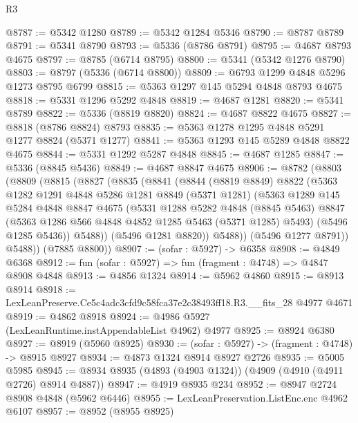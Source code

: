 \begin{lexlean}{R3}
\begin{coremodule}
@8787 := @5342 @1280
@8789 := @5342 @1284 @5346
@8790 := @8787 @8789
@8791 := @5341 @8790
@8793 := @5336 (@8786 @8791)
@8795 := @4687 @8793 @4675
@8797 := @8785 (@6714 @8795)
@8800 := @5341 (@5342 @1276 @8790)
@8803 := @8797 (@5336 (@6714 @8800))
@8809 := @6793 @1299 @4848 @5296 @1273 @8795 @6799
@8815 := @5363 @1297 @145 @5294 @4848 @8793 @4675
@8818 := @5331 @1296 @5292 @4848
@8819 := @4687 @1281
@8820 := @5341 @8789
@8822 := @5336 (@8819 @8820)
@8824 := @4687 @8822 @4675
@8827 := @8818 (@8786 @8824) @8793
@8835 := @5363 @1278 @1295 @4848 @5291 @1277 @8824 (@5371 @1277)
@8841 := @5363 @1293 @145 @5289 @4848 @8822 @4675
@8844 := @5331 @1292 @5287 @4848
@8845 := @4687 @1285
@8847 := @5336 (@8845 @5436)
@8849 := @4687 @8847 @4675
@8906 := @8782
    (@8803
      (@8809
        (@8815
          (@8827
            (@8835
              (@8841
                (@8844
                  (@8819 @8849)
                  @8822
                  (@5363
                    @1282
                    @1291
                    @4848
                    @5286
                    @1281
                    @8849
                    (@5371 @1281)
                    (@5363
                      @1289
                      @145
                      @5284
                      @4848
                      @8847
                      @4675
                      (@5331
                        @1288
                        @5282
                        @4848
                        (@8845 @5463)
                        @8847
                        (@5363 @1286 @566 @4848 @4852 @1285 @5463 (@5371 @1285) @5493)
                        (@5496 @1285 @5436))
                      @5488))
                  (@5496 @1281 @8820))
                @5488))
            (@5496 @1277 @8791))
          @5488))
      (@7885 @8800))
@8907 := (sofar : @5927) -> @6358
@8908 := @4849 @6368
@8912 := fun (sofar : @5927) => fun (fragment : @4748) => @4847 @8908 @4848
@8913 := @4856 @1324
@8914 := @5962 @4860
@8915 := @8913 @8914
@8918 := LexLeanPreserve.Ce5c4adc3cfd9c58fca37e2c38493ff18.R3.__fits_28 @4977 @4671
@8919 := @4862 @8918
@8924 := @4986 @5927 (LexLeanRuntime.instAppendableList @4962) @4977
@8925 := @8924 @6380
@8927 := @8919 (@5960 @8925)
@8930 := (sofar : @5927) -> (fragment : @4748) -> @8915 @8927
@8934 := @4873 @1324 @8914 @8927 @2726
@8935 := @5005 @5985
@8945 := @8934 @8935 (@4893 (@4903 @1324)) (@4909 (@4910 (@4911 @2726) @8914 @4887))
@8947 := @4919 @8935 @234
@8952 := @8947 @2724 @8908 @4848 (@5962 @6446)
@8955 := LexLeanPreservation.ListEnc.enc @4962 @6107
@8957 := @8952 (@8955 @8925)

\end{coremodule}
\end{lexlean}
